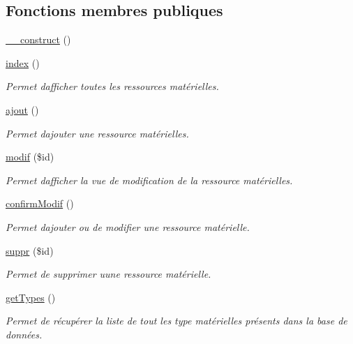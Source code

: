 \subsection*{Fonctions membres publiques}
\begin{DoxyCompactItemize}
\item 
\hyperlink{class_ressources_mat_a887de1b42531d40174febdc19f1acbad}{\+\_\+\+\_\+construct} ()
\item 
\hyperlink{class_ressources_mat_acc06aac7c0d66876993fc0c98b957a03}{index} ()
\begin{DoxyCompactList}\small\item\em Permet d\textquotesingle{}afficher toutes les ressources matérielles. \end{DoxyCompactList}\item 
\hyperlink{class_ressources_mat_a35e8eb66e536efc675f7e0accbbbfbf1}{ajout} ()
\begin{DoxyCompactList}\small\item\em Permet d\textquotesingle{}ajouter une ressource matérielles. \end{DoxyCompactList}\item 
\hyperlink{class_ressources_mat_afbe710775eca4dfbd9f67a51d3777888}{modif} (\$id)
\begin{DoxyCompactList}\small\item\em Permet d\textquotesingle{}afficher la vue de modification de la ressource matérielles. \end{DoxyCompactList}\item 
\hyperlink{class_ressources_mat_a0c2e974f15851cc42afa8f5428581818}{confirm\+Modif} ()
\begin{DoxyCompactList}\small\item\em Permet d\textquotesingle{}ajouter ou de modifier une ressource matérielle. \end{DoxyCompactList}\item 
\hyperlink{class_ressources_mat_a61c24d6e53f6a5d69470c4a88da3e24a}{suppr} (\$id)
\begin{DoxyCompactList}\small\item\em Permet de supprimer uune ressource matérielle. \end{DoxyCompactList}\item 
\hyperlink{class_ressources_mat_a47413435e6b3bcc8c7ed5f54360246ce}{get\+Types} ()
\begin{DoxyCompactList}\small\item\em Permet de récupérer la liste de tout les type matérielles présents dans la base de données. \end{DoxyCompactList}\end{DoxyCompactItemize}


